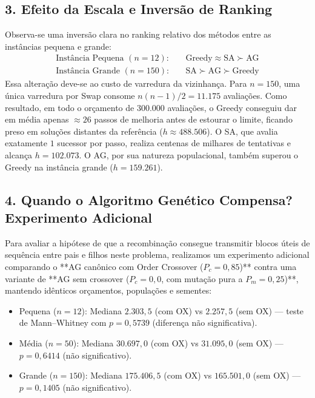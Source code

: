 \documentclass[11pt,a4paper]{article}
\begin{document}
\subsection{3. Efeito da Escala e Inversão de Ranking}
Observa-se uma inversão clara no ranking relativo dos métodos entre as instâncias pequena e grande:
\begin{align*}
\text{Instância Pequena } (n=12): & \quad \text{Greedy} \approx \text{SA} \succ \text{AG} \\
\text{Instância Grande } (n=150): & \quad \text{SA} \succ \text{AG} \succ \text{Greedy}
\end{align*}
Essa alteração deve-se ao custo de varredura da vizinhança. Para $n=150$, uma única varredura por Swap consome $n(n-1)/2 = 11.175$ avaliações. Como resultado, em todo o orçamento de $300.000$ avaliações, o Greedy conseguiu dar em média apenas $\approx 26$ passos de melhoria antes de estourar o limite, ficando preso em soluções distantes da referência ($h \approx 488.506$). O SA, que avalia exatamente $1$ sucessor por passo, realiza centenas de milhares de tentativas e alcança $h = 102.073$. O AG, por sua natureza populacional, também superou o Greedy na instância grande ($h = 159.261$).

\subsection{4. Quando o Algoritmo Genético Compensa? Experimento Adicional}
Para avaliar a hipótese de que a recombinação consegue transmitir blocos úteis de sequência entre pais e filhos neste problema, realizamos um experimento adicional comparando o **AG canônico com Order Crossover ($P_c = 0,85$)** contra uma variante de **AG sem crossover ($P_c = 0,0$, com mutação pura a $P_m = 0,25$)**, mantendo idênticos orçamentos, populações e sementes:
\begin{itemize}
    \item Pequena ($n=12$): Mediana $2.303,5$ (com OX) vs $2.257,5$ (sem OX) --- teste de Mann--Whitney com $p = 0,5739$ (diferença não significativa).
    \item Média ($n=50$): Mediana $30.697,0$ (com OX) vs $31.095,0$ (sem OX) --- $p = 0,6414$ (não significativo).
    \item Grande ($n=150$): Mediana $175.406,5$ (com OX) vs $165.501,0$ (sem OX) --- $p = 0,1405$ (não significativo).
\end{itemize}
\end{document}
